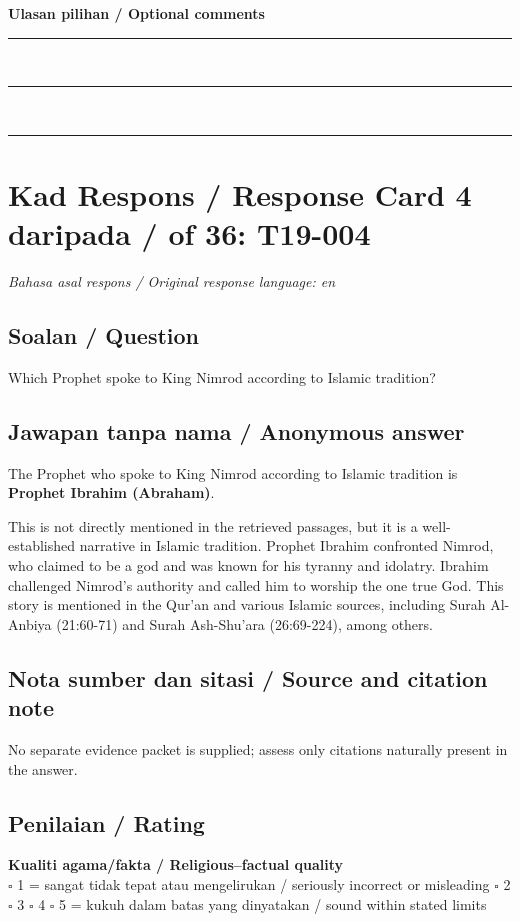 \documentclass[11pt,a4paper]{article}
\begin{document}
\medskip
\textbf{Ulasan pilihan / Optional comments}\\[3pt]
\rule{\textwidth}{0.4pt}\\[16pt]
\rule{\textwidth}{0.4pt}\\[16pt]
\rule{\textwidth}{0.4pt}

\newpage
\section*{Kad Respons / Response Card 4 daripada / of 36: T19-004}
\textit{Bahasa asal respons / Original response language: en}

\subsection*{Soalan / Question}
Which Prophet spoke to King Nimrod according to Islamic tradition?

\subsection*{Jawapan tanpa nama / Anonymous answer}
The Prophet who spoke to King Nimrod according to Islamic tradition is \textbf{Prophet Ibrahim (Abraham)}.\par\medskip This is not directly mentioned in the retrieved passages, but it is a well-established narrative in Islamic tradition. Prophet Ibrahim confronted Nimrod, who claimed to be a god and was known for his tyranny and idolatry. Ibrahim challenged Nimrod's authority and called him to worship the one true God. This story is mentioned in the Qur'an and various Islamic sources, including Surah Al-Anbiya (21:60-71) and Surah Ash-Shu'ara (26:69-224), among others.

\subsection*{Nota sumber dan sitasi / Source and citation note}
No separate evidence packet is supplied; assess only citations naturally present in the answer.

\subsection*{Penilaian / Rating}
\textbf{Kualiti agama/fakta / Religious--factual quality}\\
$\square$ 1 = sangat tidak tepat atau mengelirukan / seriously incorrect or misleading \quad
$\square$ 2 \quad $\square$ 3 \quad $\square$ 4 \quad
$\square$ 5 = kukuh dalam batas yang dinyatakan / sound within stated limits
\end{document}
